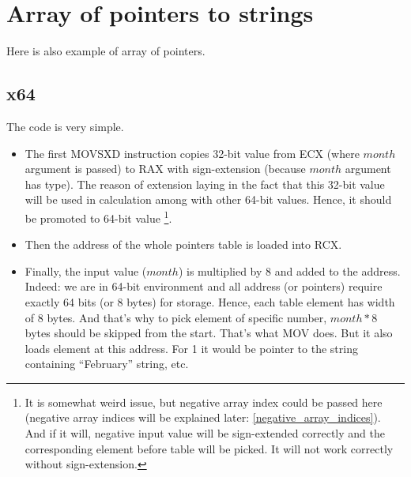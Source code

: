 ﻿%
\ifdefined\RUSSIAN
\else
\section{Array of pointers to strings}
\label{array_of_pointers_to_strings}

Here is also example of array of pointers.



\subsection{x64}

The code is very simple. 

\begin{itemize}

\item
The first MOVSXD instruction copies 32-bit value from ECX (where $month$ argument is passed) 
to RAX with sign-extension (because $month$ argument has \Tint type).
The reason of extension laying in the fact that this 32-bit value will be used in calculation among
with other 64-bit values. 
Hence, it should be promoted to 64-bit value
\footnote{It is somewhat weird issue, but negative array index could be passed here 
(negative array indices will be explained later: \ref{negative_array_indices}). 
And if it will, negative input \Tint value will be sign-extended correctly 
and the corresponding element before table will be picked. 
It will not work correctly without sign-extension.}.

\item
Then the address of the whole pointers table is loaded into RCX.

\item
Finally, the input value ($month$) is multiplied by 8 and added to the address.
Indeed: we are in 64-bit environment and all address (or pointers) require exactly 64 bits (or 8 bytes) 
for storage.
Hence, each table element has width of 8 bytes.
And that's why to pick element of specific number, $month*8$ bytes should be skipped from the start.
That's what MOV does.
But it also loads element at this address.
For 1 it would be pointer to the string containing ``February'' string, etc.

\end{itemize}




